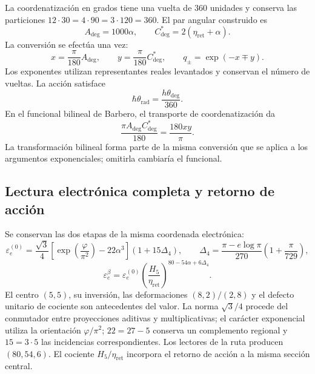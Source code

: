 La coordenatización en grados tiene una vuelta de $360$ unidades y conserva las
particiones $12\cdot30=4\cdot90=3\cdot120=360$. El par angular construido es
\begin{equation}
 A_{\deg}=1000\alpha,
 \qquad C^*_{\deg}=2(\eta_{\mathrm{ret}}+\alpha).
 \label{md:compos:par-angular}
\end{equation}
La conversión se efectúa una vez:
\begin{equation}
 x=\frac{\pi}{180}A_{\deg},\qquad
 y=\frac{\pi}{180}C^*_{\deg},\qquad
 q_\pm=\exp(-x\mp y).
 \label{md:compos:canales}
\end{equation}
Los exponentes utilizan representantes reales levantados y conservan el
número de vueltas. La acción satisface
\begin{equation}
 \hbar\theta_{\mathrm{rad}}
 =\frac{h\theta_{\deg}}{360}.
 \label{md:compos:accion-cartas}
\end{equation}
En el funcional bilineal de Barbero, el transporte de coordenatización da
\begin{equation}
 \frac{\pi A_{\deg}C^*_{\deg}}{180}
 =\frac{180xy}{\pi}.
 \label{md:compos:bilineal-cartas}
\end{equation}
La transformación bilineal forma parte de la misma conversión que se aplica
a los argumentos exponenciales; omitirla cambiaría el funcional.

\subsection{Lectura electrónica completa y retorno de acción}
\label{md:compos:electron}

Se conservan las dos etapas de la misma coordenada electrónica:
\begin{equation}
 \varepsilon_e^{(0)}=\frac{\sqrt{3}}{4}
 \left[\exp\!\left(\frac{\varphi}{\pi^2}\right)-22\alpha^3\right]
 (1+15\Delta_4),\qquad
 \Delta_4=\frac{\pi-e\log\pi}{270}
 \left(1+\frac{\pi}{729}\right),
 \label{md:compos:electron-basal}
\end{equation}
\begin{equation}
 \boxed{\varepsilon_e^\beta=\varepsilon_e^{(0)}
 \left(\frac{H_5}{\eta_{\mathrm{ret}}}\right)^{80-54\alpha+6\Delta_4}.}
 \label{md:compos:electron-completo}
\end{equation}
El centro $(5,5)$, su inversión, las deformaciones $(8,2)/(2,8)$ y el
defecto unitario de cociente son antecedentes del valor. La norma
$\sqrt{3}/4$ procede del conmutador entre proyecciones aditivas y
multiplicativas; el carácter exponencial utiliza la orientación
$\varphi/\pi^2$; $22=27-5$ conserva un complemento regional y $15=3\cdot5$
las incidencias correspondientes. Los lectores de la ruta producen
$(80,54,6)$. El cociente $H_5/\eta_{\mathrm{ret}}$ incorpora el retorno de
acción a la misma sección central.

